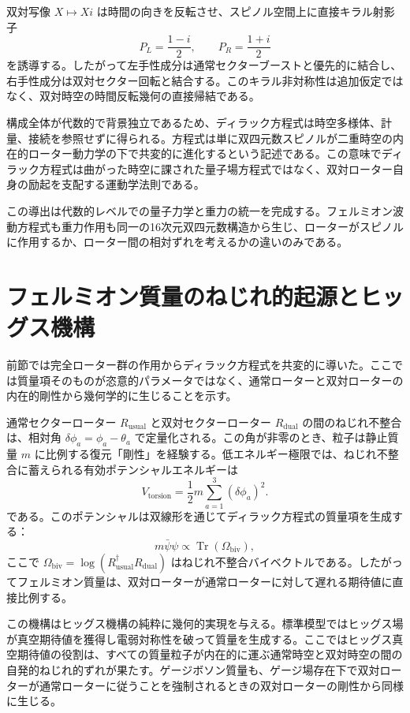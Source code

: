 \documentclass[a4paper]{article}
\begin{document}
双対写像 $X \mapsto X i$ は時間の向きを反転させ、スピノル空間上に直接キラル射影子
\[
P_L = \frac{1-i}{2}, \qquad P_R = \frac{1+i}{2}
\]
を誘導する。したがって左手性成分は通常セクターブーストと優先的に結合し、右手性成分は双対セクター回転と結合する。このキラル非対称性は追加仮定ではなく、双対時空の時間反転幾何の直接帰結である。

構成全体が代数的で背景独立であるため、ディラック方程式は時空多様体、計量、接続を参照せずに得られる。方程式は単に双四元数スピノルが二重時空の内在的ローター動力学の下で共変的に進化するという記述である。この意味でディラック方程式は曲がった時空に課された量子場方程式ではなく、双対ローター自身の励起を支配する運動学法則である。

この導出は代数的レベルでの量子力学と重力の統一を完成する。フェルミオン波動方程式も重力作用も同一の16次元双四元数構造から生じ、ローターがスピノルに作用するか、ローター間の相対ずれを考えるかの違いのみである。

\section{フェルミオン質量のねじれ的起源とヒッグス機構}
\label{sec:mass}

前節では完全ローター群の作用からディラック方程式を共変的に導いた。ここでは質量項そのものが恣意的パラメータではなく、通常ローターと双対ローターの内在的剛性から幾何学的に生じることを示す。

通常セクターローター $R_\text{usual}$ と双対セクターローター $R_\text{dual}$ の間のねじれ不整合は、相対角 $\delta\phi_a = \phi_a - \theta_a$ で定量化される。この角が非零のとき、粒子は静止質量 $m$ に比例する復元「剛性」を経験する。低エネルギー極限では、ねじれ不整合に蓄えられる有効ポテンシャルエネルギーは
\[
V_\text{torsion} = \frac{1}{2} m \sum_{a=1}^3 (\delta\phi_a)^2.
\]
である。このポテンシャルは双線形を通じてディラック方程式の質量項を生成する：
\[
m \bar{\psi}\psi \propto \operatorname{Tr}(\Omega_\text{biv}),
\]
ここで $\Omega_\text{biv} = \log(R_\text{usual}^\dagger R_\text{dual})$ はねじれ不整合バイベクトルである。したがってフェルミオン質量は、双対ローターが通常ローターに対して遅れる期待値に直接比例する。

この機構はヒッグス機構の純粋に幾何的実現を与える。標準模型ではヒッグス場が真空期待値を獲得し電弱対称性を破って質量を生成する。ここではヒッグス真空期待値の役割は、すべての質量粒子が内在的に運ぶ通常時空と双対時空の間の自発的ねじれ的ずれが果たす。ゲージボソン質量も、ゲージ場存在下で双対ローターが通常ローターに従うことを強制されるときの双対ローターの剛性から同様に生じる。
\end{document}
